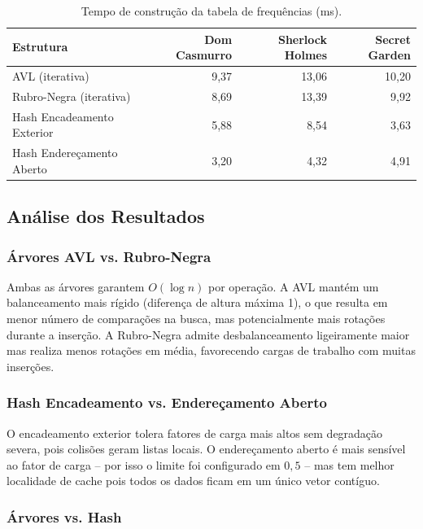 \documentclass[12pt, a4paper]{article}
\begin{document}
\begin{table}[H]
\centering
\caption{Tempo de construção da tabela de frequências (ms).}
\begin{tabular}{lrrr}
\toprule
\textbf{Estrutura} & \textbf{Dom Casmurro} & \textbf{Sherlock Holmes} & \textbf{Secret Garden} \\
\midrule
AVL (iterativa)            & 9,37  & 13,06 & 10,20 \\
Rubro-Negra (iterativa)    & 8,69  & 13,39 & 9,92  \\
Hash Encadeamento Exterior & 5,88  & 8,54  & 3,63  \\
Hash Endereçamento Aberto  & 3,20  & 4,32  & 4,91  \\
\bottomrule
\end{tabular}
\end{table}

\subsection{Análise dos Resultados}

\subsubsection{Árvores AVL vs. Rubro-Negra}

Ambas as árvores garantem $O(\log n)$ por operação. A AVL mantém um balanceamento mais
rígido (diferença de altura máxima 1), o que resulta em menor número de comparações na
busca, mas potencialmente mais rotações durante a inserção. A Rubro-Negra admite
desbalanceamento ligeiramente maior mas realiza menos rotações em média, favorecendo
cargas de trabalho com muitas inserções.

\subsubsection{Hash Encadeamento vs. Endereçamento Aberto}

O encadeamento exterior tolera fatores de carga mais altos sem degradação severa, pois
colisões geram listas locais. O endereçamento aberto é mais sensível ao fator de carga
-- por isso o limite foi configurado em $0{,}5$ -- mas tem melhor localidade de cache
pois todos os dados ficam em um único vetor contíguo.

\subsubsection{Árvores vs. Hash}
\end{document}
